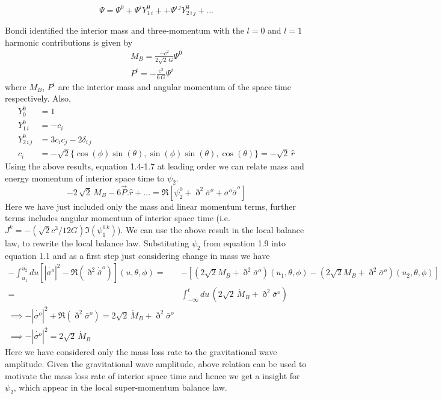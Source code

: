 \documentclass[prd,preprintnumbers,onecolumn,eqsecnum,floatfix,letter]{revtex4}
\begin{document}
\begin{equation}
	\Psi = \Psi^{0} + \Psi^{i}Y^{0}_{1\,i} + + \Psi^{i\,j}Y^{0}_{2\,i\,j} + ...
\end{equation} 

Bondi identified the interior mass and three-momentum with the $l=0$ and $l=1$ harmonic contributions is given by
\begin{align}
	M_{B} = \frac{-c^{2}}{2\sqrt{2}\,G}\Psi^{0}\\
	P^{i} = -\frac{c^3}{6\,G}\Psi^i
\end{align}
where $M_{B}$, $P^{i}$ are the interior mass and angular momentum of the space time respectively. Also,
\begin{align}
	Y^{0}_{0} &= 1 \nonumber \\
	Y^{0}_{1\,i} &= -c_i \nonumber \\
	Y^{0}_{2\,i\,j} &= 3c_{i}c_{j} - 2\delta_{i\,j} \nonumber \\
	c_{i} &= -\sqrt{2}\{\cos(\phi)\sin(\theta), \sin(\phi)\sin(\theta), \cos(\theta)\} = -\sqrt{2}\,\hat{r}
\end{align}
Using the above results, equation 1.4-1.7 at leading order we can relate mass and energy momentum of interior space time to $\psi_2$. 
\begin{equation}
	-2\,\sqrt{2}\,M_B -6 \vec{P}.\hat{r} + ... = \Re\left[\psi^{0}_{2} + \eth^{2}\bar{\sigma}^{o} + {\sigma}^{o}\dot{\bar{\sigma}}^{o} \right]
\end{equation}
Here we have just included only the mass and linear momentum terms, further terms includes angular momentum of interior space time (i.e. $J^k = -(\sqrt{2}c^3/12G)\Im(\psi^{0\,k}_{1})$). We can use the above result in the local balance law, to rewrite the local balance law. Substituting $\psi_2$ from equation 1.9 into equation 1.1 and as a first step just considering change in mass we have
\begin{align}
	 -\int_{u_{1}}^{u_{2}} du \left[|\dot{\sigma^{o}}|^{2} - \Re\left(\eth^{2}\dot{\bar{\sigma}}^{o} \right) \right](u, \theta, \phi) =& -\left[\left(2\sqrt{2}M_B + \eth^{2}\bar{\sigma}^{o}\right)(u_1, \theta, \phi) - \left(2\sqrt{2}M_B + \eth^{2}\bar{\sigma}^{o}\right)(u_2, \theta, \phi)\right]\\ = & \int_{-\infty}^{t} du\, \left(2\sqrt{2}\,\dot{M}_B+ \eth^{2}\bar{\sigma}^{o} \right)\\ \implies -|\dot{\sigma^{o}}|^{2} + \Re\left( \eth^{2}\bar{\sigma}^{o}\right) = 2\sqrt{2}\,\dot{M}_B + \eth^{2}\bar{\sigma}^{o} \\ \implies  -|\dot{\sigma^{o}}|^{2}  = 2\sqrt{2}\,\dot{M}_B  
\end{align}
Here we have considered only the mass loss rate to the gravitational wave amplitude. Given the gravitational wave amplitude, above relation can be used to motivate the mass loss rate of interior space time and hence we get a insight for $\psi_2$, which appear in the local super-momentum balance law. 
\end{document}

